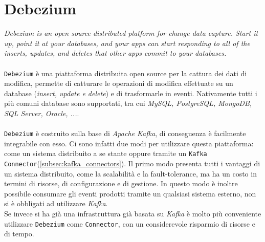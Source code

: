 \section{Debezium}
\label{sec:debezium_overview}
\textit{Debezium is an open source distributed platform for change data capture. Start it up, point it at your databases, and your apps can start responding to all of the inserts, updates, and deletes that other apps commit to your databases.}\cite*{debeziumwebsite}\\\\
\texttt{Debezium} è una piattaforma distribuita open source per la cattura dei dati di modifica, permette di catturare le operazioni di modifica effettuate su un database (\textit{insert, update e delete}) e di trasformarle in eventi.
Nativamente tutti i più comuni database sono supportati, tra cui \textit{MySQL, PostgreSQL, MongoDB, SQL Server, Oracle, ...}.\\\\
\texttt{Debezium} è costruito sulla base di \textit{Apache Kafka}, di conseguenza è facilmente integrabile con esso.
Ci sono infatti due modi per utilizzare questa piattaforma: come un sistema distribuito a se stante oppure tramite un \texttt{Kafka Connector}(\ref{subsec:kafka_connectors}).
Il primo modo presenta tutti i vantaggi di un sistema distribuito, come la scalabilità e la fault-tolerance, ma ha un costo in termini di risorse, di configurazione e di gestione.
In questo modo è inoltre possibile consumare gli eventi prodotti tramite un qualsiasi sistema esterno, non si è obbligati ad utilizzare \textit{Kafka}.\\
Se invece si ha già una infrastruttura già basata su \textit{Kafka} è molto più conveniente utilizzare \texttt{Debezium} come \texttt{Connector}, con un considerevole risparmio di risorse e di tempo.  

\newpage
